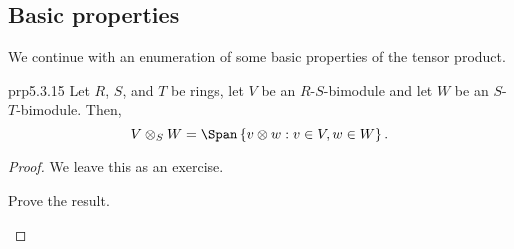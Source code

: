 \subsection{Basic properties}

We continue with an enumeration of some basic properties of the tensor product.
\begin{prp}{}{prp5.3.15}
	Let $R$, $S$, and $T$ be rings, let $V$ be an $R$-$S$-bimodule and let $W$ be an $S$-$T$-bimodule.  Then,
	\begin{equation}
	V\otimes _SW=\Span \left\{ v\otimes w:v\in V,w\in W\right\} .
	\end{equation}
	\begin{proof}
		We leave this as an exercise.
		\begin{exr}[breakable=false]{}{}
			Prove the result.
		\end{exr}
	\end{proof}
\end{prp}
